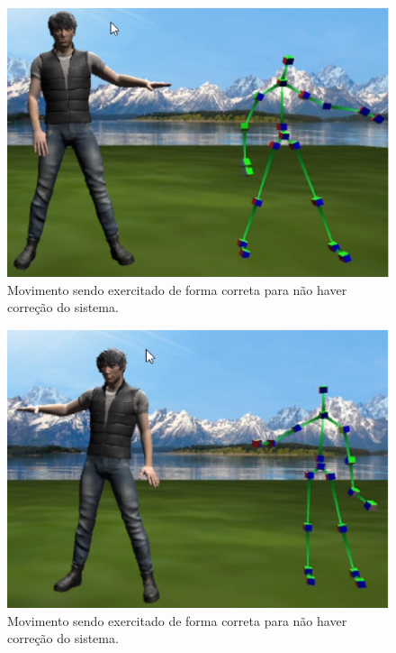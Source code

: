   \begin{figure}[H]
  \centering
  \includegraphics [keepaspectratio=true,scale=0.60]{figuras/bracoDireitaCerta.eps}
  \caption{Movimento sendo exercitado de forma correta para não haver correção do sistema.}
  \label{img:bracoDireitaCerta}
  \end{figure}

  \begin{figure}[H]
  \centering
  \includegraphics [keepaspectratio=true,scale=0.60]{figuras/bracoEsquerdaCerta.eps}
  \caption{Movimento sendo exercitado de forma correta para não haver correção do sistema.}
  \label{img:bracoEsquerdaCerta}
  \end{figure}





